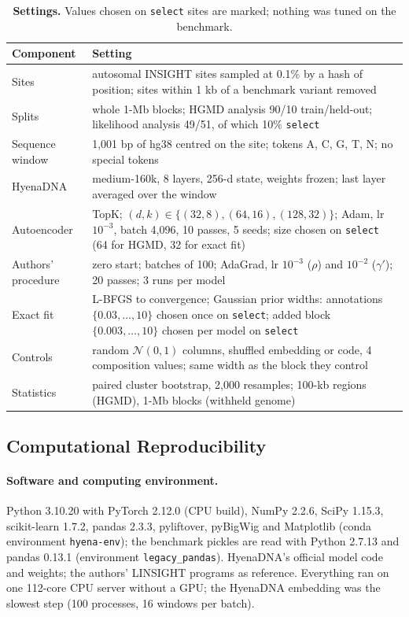 \documentclass[11pt]{article}
\newcommand{\file}[1]{\nolinkurl{#1}}
\begin{document}
\begin{table}[t]
\centering\footnotesize
\caption{\textbf{Settings.} Values chosen on \texttt{select} sites are marked; nothing was tuned on the benchmark.}
\label{tab:settings}
\begin{tabularx}{\textwidth}{@{}l X@{}}
\toprule
Component & Setting \\
\midrule
Sites & autosomal INSIGHT sites sampled at 0.1\% by a hash of position; sites within 1 kb of a benchmark variant removed \\
Splits & whole 1-Mb blocks; HGMD analysis 90/10 train/held-out; likelihood analysis 49/51, of which 10\% \texttt{select} \\
Sequence window & 1,001 bp of hg38 centred on the site; tokens A, C, G, T, N; no special tokens \\
HyenaDNA & medium-160k, 8 layers, 256-d state, weights frozen; last layer averaged over the window \\
Autoencoder & TopK; $(d,k)\in\{(32,8),(64,16),(128,32)\}$; Adam, lr $10^{-3}$, batch 4,096, 10 passes, 5 seeds; size chosen on \texttt{select} (64 for HGMD, 32 for exact fit) \\
Authors' procedure & zero start; batches of 100; AdaGrad, lr $10^{-3}$ ($\rho$) and $10^{-2}$ ($\gamma'$); 20 passes; 3 runs per model \\
Exact fit & L-BFGS to convergence; Gaussian prior widths: annotations $\{0.03,\dots,10\}$ chosen once on \texttt{select}; added block $\{0.003,\dots,10\}$ chosen per model on \texttt{select} \\
Controls & random $\mathcal{N}(0,1)$ columns, shuffled embedding or code, 4 composition values; same width as the block they control \\
Statistics & paired cluster bootstrap, 2,000 resamples; 100-kb regions (HGMD), 1-Mb blocks (withheld genome) \\
\bottomrule
\end{tabularx}
\end{table}

\subsection*{Computational Reproducibility}
\paragraph{Software and computing environment.} Python 3.10.20 with PyTorch 2.12.0 (CPU build), NumPy 2.2.6, SciPy 1.15.3,
scikit-learn 1.7.2, pandas 2.3.3, pyliftover, pyBigWig and Matplotlib (conda environment \file{hyena-env}); the benchmark pickles are read with Python
2.7.13 and pandas 0.13.1 (environment \file{legacy_pandas}). HyenaDNA's official model code and weights;
the authors' LINSIGHT programs as reference. Everything ran on one 112-core CPU server without a GPU; the
HyenaDNA embedding was the slowest step (100 processes, 16 windows per batch).
\end{document}
